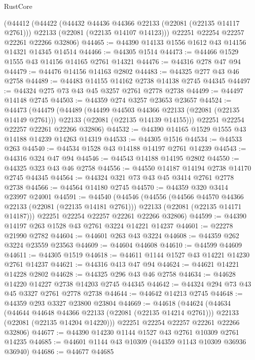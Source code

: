 \begin{lexlean}{RustCore}
\begin{coremodule}
    (@44412
      (@44422
        (@44432 @44436 @44366 @22133 (@22081 (@22135 @14117 @2761)))
        @22133
        (@22081 (@22135 @14107 @14123)))
      @22251
      @22254
      @22257
      @22261
      @22266
      @32806)
@44465 := @44390 @14133 @1556 @1612 @43 @14156 @14321 @14345 @14514
@44466 := @44305 @1514
@44473 := @44466 @1529 @1555 @43 @14156 @14165 @2761 @14321
@44476 := @44316 @278 @47 @94
@44479 := @44476 @14156 @14163 @2802
@44483 := @44325 @277 @43 @46 @2758
@44489 := @44483 @14155 @14162 @2738 @14138 @2745 @44345
@44497 := @44324 @275 @73 @43 @45 @3257 @2761 @2778 @2738
@44499 := @44497 @14148 @2745
@44503 := @44359 @274 @3257 @23653 @23657
@44524 := @44473
    (@44479
      (@44489
        (@44499 @44503 @44366 @22133 (@22081 (@22135 @14149 @2761)))
        @22133
        (@22081 (@22135 @14139 @14155)))
      @22251
      @22254
      @22257
      @22261
      @22266
      @32806)
@44532 := @44390 @14165 @1529 @1555 @43 @14188 @14239 @14263 @14319
@44533 := @44305 @1516
@44534 := @44533 @263
@44540 := @44534 @1528 @43 @14188 @14197 @2761 @14239
@44543 := @44316 @324 @47 @94
@44546 := @44543 @14188 @14195 @2802
@44550 := @44325 @323 @43 @46 @2758
@44556 := @44550 @14187 @14194 @2738 @14170 @2745 @44345
@44564 := @44324 @321 @73 @43 @45 @3414 @2761 @2778 @2738
@44566 := @44564 @14180 @2745
@44570 := @44359 @320 @3414 @23997 @24001
@44591 := @44540
    (@44546
      (@44556
        (@44566 @44570 @44366 @22133 (@22081 (@22135 @14181 @2761)))
        @22133
        (@22081 (@22135 @14171 @14187)))
      @22251
      @22254
      @22257
      @22261
      @22266
      @32806)
@44599 := @44390 @14197 @263 @1528 @43 @2761 @3224 @14221 @14237
@44601 := @22278 @21990 @2782
@44604 := @44601 @263 @43 @3224
@44608 := @44359 @262 @3224 @23559 @23563
@44609 := @44604 @44608
@44610 := @44599 @44609
@44611 := @44305 @1519
@44618 := @44611 @1144 @1527 @43 @14221 @14230 @2761 @14237
@44621 := @44316 @413 @47 @94
@44624 := @44621 @14221 @14228 @2802
@44628 := @44325 @296 @43 @46 @2758
@44634 := @44628 @14220 @14227 @2738 @14203 @2745 @44345
@44642 := @44324 @294 @73 @43 @45 @3327 @2761 @2778 @2738
@44644 := @44642 @14213 @2745
@44648 := @44359 @293 @3327 @23800 @23804
@44669 := @44618
    (@44624
      (@44634
        (@44644 @44648 @44366 @22133 (@22081 (@22135 @14214 @2761)))
        @22133
        (@22081 (@22135 @14204 @14220)))
      @22251
      @22254
      @22257
      @22261
      @22266
      @32806)
@44677 := @44390 @14230 @1144 @1527 @43 @2761 @10309 @2761 @14235
@44685 := @44601 @1144 @43 @10309 (@44359 @1143 @10309 @36936 @36940)
@44686 := @44677 @44685

\end{coremodule}
\end{lexlean}
